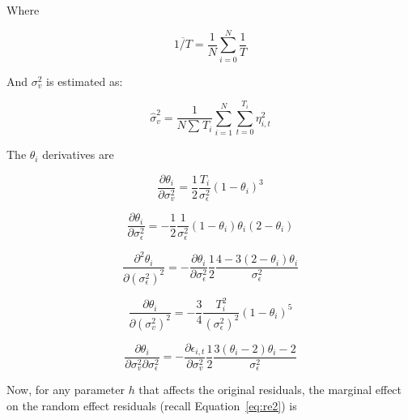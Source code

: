 \documentclass[12pt]{article}
\begin{document}
Where

\begin{equation}
\overline{1/T} = \frac{1}{N}\sum_{i = 0}^{N}\frac{1}{T}
\label{eq:re5}
\end{equation}

And $\sigma_{v}^{2}$ is estimated as:

\begin{equation}
{\widehat{\sigma}}_{v}^{2} = \frac{1}{N\sum_{}^{}T_{i}}\sum_{i = 1}^{N}{\sum_{t = 0}^{T_{i}}\eta_{i,t}^{2}}
\label{eq:re6}
\end{equation}

The $\theta_{i}$ derivatives are

\begin{equation}
\frac{\partial\theta_{i}}{\partial\sigma_{v}^{2}} = \frac{1}{2}\frac{T_{i}}{\sigma_{\epsilon}^{2}}\left( 1 - \theta_{i} \right)^{3}
\label{eq:re7}
\end{equation}

\begin{equation}
\frac{\partial\theta_{i}}{\partial\sigma_{\epsilon}^{2}} = - \frac{1}{2}\frac{1}{\sigma_{\epsilon}^{2}}\left( 1 - \theta_{i} \right)\theta_{i}\left( 2 - \theta_{i} \right)
\label{eq:re7b}
\end{equation}

\begin{equation}
\frac{\partial^{2}\theta_{i}}{{\partial\left( \sigma_{\epsilon}^{2} \right)}^{2}} = - \frac{\partial\theta_{i}}{\partial\sigma_{\epsilon}^{2}}\frac{1}{2}\frac{4 - 3\left( 2 - \theta_{i} \right)\theta_{i}}{\sigma_{\epsilon}^{2}}
\label{eq:re8}
\end{equation}

\begin{equation}
\frac{\partial\theta_{i}}{\partial\left( \sigma_{v}^{2} \right)^{2}} = - \frac{3}{4}\frac{T_{i}^{2}}{\left( \sigma_{\epsilon}^{2} \right)^{2}}\left( 1 - \theta_{i} \right)^{5}
\label{eq:re9}
\end{equation}

\begin{equation}\frac{\partial\theta_{i}}{\partial\sigma_{v}^{2}\partial\sigma_{\epsilon}^{2}} = - \frac{\partial\epsilon_{i,t}}{\partial\sigma_{v}^{2}}\frac{1}{2}\frac{3\left( \theta_{i} - 2 \right)\theta_{i} - 2}{\sigma_{\epsilon}^{2}}
\label{eq:re10}
\end{equation}

Now, for any parameter $h$ that affects the original residuals, the
marginal effect on the random effect residuals (recall Equation~\ref{eq:re2}) is
\end{document}
